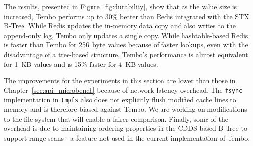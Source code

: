 The results, presented in Figure~\ref{fig:durability}, show that as
the value size is increased, Tembo performs up to 30\% better than
Redis integrated with the STX B-Tree.  While Redis updates the
in-memory data copy and also writes to the append-only log, Tembo only
updates a single copy.  While hashtable-based Redis is faster than
Tembo for 256~byte values because of faster lookups, even
with the disadvantage of a tree-based structure, Tembo's performance
is almost equivalent for 1~KB values and is 15\% faster for 4~KB
values.

The improvements for the experiments in this section are lower than those in
Chapter~\ref{sec:api_microbench} because of network latency overhead.  The
\texttt{fsync} implementation in \texttt{tmpfs} also does not explicitly flush
modified cache lines to memory and is therefore biased against Tembo.  We are
working on modifications to the file system that will enable a fairer
comparison.  Finally, some of the overhead is due to maintaining ordering
properties in the CDDS-based B-Tree to support range scans - a feature not used
in the current implementation of Tembo.


